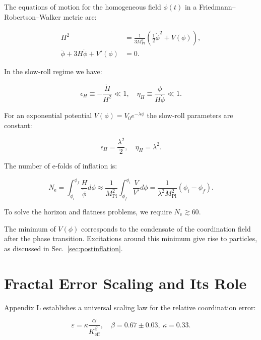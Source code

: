 \documentclass[12pt]{article}
\theoremstyle{remark}
\newcommand{\Keff}{K_{\mathrm{eff}}}
\newcommand{\eps}{\varepsilon}
\newcommand{\kappac}{\kappa}
\newcommand{\Mpl}{M_{\mathrm{Pl}}}
\newcommand{\ninf}{N_{\mathrm{e}}}
\begin{document}
	The equations of motion for the homogeneous field $\phi(t)$ in a Friedmann–Robertson–Walker metric are:
	
	\begin{align}
		H^2 &= \frac{1}{3\Mpl^2} \left( \frac{1}{2}\dot{\phi}^2 + V(\phi) \right), \label{eq:friedman1} \\
		\ddot{\phi} + 3H\dot{\phi} + V'(\phi) &= 0. \label{eq:field}
	\end{align}
	
	In the slow‑roll regime we have:
	
	\begin{equation}
		\epsilon_H \equiv -\frac{\dot{H}}{H^2} \ll 1, \quad \eta_H \equiv \frac{\ddot{\phi}}{H\dot{\phi}} \ll 1.
	\end{equation}
	
	For an exponential potential $V(\phi) = V_0 e^{-\lambda \phi}$ the slow‑roll parameters are constant:
	
	\begin{equation}
		\epsilon_H = \frac{\lambda^2}{2}, \quad \eta_H = \lambda^2.
		\label{eq:slowroll}
	\end{equation}
	
	The number of e‑folds of inflation is:
	
	\begin{equation}
		\ninf = \int_{\phi_i}^{\phi_f} \frac{H}{\dot{\phi}} d\phi \approx \frac{1}{\Mpl^2} \int_{\phi_f}^{\phi_i} \frac{V}{V'} d\phi = \frac{1}{\lambda^2 \Mpl^2} (\phi_i - \phi_f).
	\end{equation}
	
	To solve the horizon and flatness problems, we require $\ninf \gtrsim 60$.
	
	The minimum of $V(\phi)$ corresponds to the condensate of the coordination field after the phase transition. Excitations around this minimum give rise to particles, as discussed in Sec.~\ref{sec:postinflation}.
	
	\section{Fractal Error Scaling and Its Role}
	\label{sec:fractal}
	
	Appendix L establishes a universal scaling law for the relative coordination error:
	
	\begin{equation}
		\eps = \kappac \frac{\alpha}{\Keff^{\beta}}, \quad \beta = 0.67 \pm 0.03,\ \kappac = 0.33.
		\label{eq:error-scaling}
	\end{equation}
	
\end{document}
